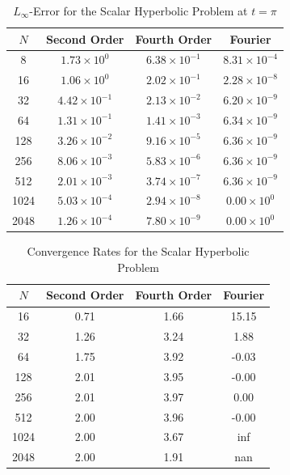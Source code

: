 \begin{table}[H]
	\centering
	\begin{tabular}{|c|c|c|c|}
		\hline
		$N$  & Second Order          & Fourth Order          & Fourier                \\
		\hline
		8    & $1.73 \times 10^{0}$  & $6.38 \times 10^{-1}$ & $8.31 \times 10^{-4}$  \\
		16   & $1.06 \times 10^{0}$  & $2.02 \times 10^{-1}$ & $2.28 \times 10^{-8}$  \\
		32   & $4.42 \times 10^{-1}$ & $2.13 \times 10^{-2}$ & $6.20 \times 10^{-9}$  \\
		64   & $1.31 \times 10^{-1}$ & $1.41 \times 10^{-3}$ & $6.34 \times 10^{-9}$  \\
		128  & $3.26 \times 10^{-2}$ & $9.16 \times 10^{-5}$ & $6.36 \times 10^{-9}$  \\
		256  & $8.06 \times 10^{-3}$ & $5.83 \times 10^{-6}$ & $6.36 \times 10^{-9}$  \\
		512  & $2.01 \times 10^{-3}$ & $3.74 \times 10^{-7}$ & $6.36 \times 10^{-9}$  \\
		1024 & $5.03 \times 10^{-4}$ & $2.94 \times 10^{-8}$ & $0.00 \times 10^{0}$   \\
		2048 & $1.26 \times 10^{-4}$ & $7.80 \times 10^{-9}$ & $0.00 \times 10^{0}$   \\
		\hline
	\end{tabular}
	\caption{$L_{\infty}$-Error for the Scalar Hyperbolic Problem at $t = \pi$}
	\label{tab:hyperbolic_error}
\end{table}
\begin{table}[H]
	\centering
	\begin{tabular}{|c|c|c|c|}
		\hline
		$N$  & Second Order & Fourth Order & Fourier \\
		\hline
		16   & 0.71         & 1.66         & 15.15   \\
		32   & 1.26         & 3.24         & 1.88    \\
		64   & 1.75         & 3.92         & -0.03   \\
		128  & 2.01         & 3.95         & -0.00   \\
		256  & 2.01         & 3.97         & 0.00    \\
		512  & 2.00         & 3.96         & -0.00   \\
		1024 & 2.00         & 3.67         & inf     \\
		2048 & 2.00         & 1.91         & nan     \\
		\hline
	\end{tabular}
	\caption{Convergence Rates for the Scalar Hyperbolic Problem}
	\label{tab:hyperbolic_rates}
\end{table}
